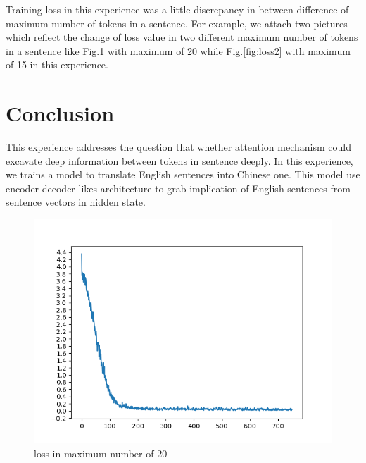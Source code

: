 \documentclass[journal, a4paper]{IEEEtran}
\begin{document}
Training loss in this experience was a little discrepancy in between difference of maximum number of tokens in a sentence. For example, we attach two pictures which reflect the change of loss value in two different maximum number of tokens in a sentence like Fig.\ref{fig:loss1} with maximum of 20 while Fig.\ref{fig:loss2} with maximum of 15 in this experience. 


\section{Conclusion}
	This experience addresses the question that whether attention mechanism could excavate deep information between tokens in sentence deeply. In this experience, we trains a model to translate English sentences into Chinese one. This model use encoder-decoder likes architecture to grab implication of English sentences from sentence vectors in hidden state.
	
	\begin{figure}
		\begin{center}
		\includegraphics[width=\columnwidth]{images/loss1.png}
		\caption{loss in maximum number of 20}
		\label{fig:loss1}
		\end{center}
	\end{figure}
	
\end{document}
